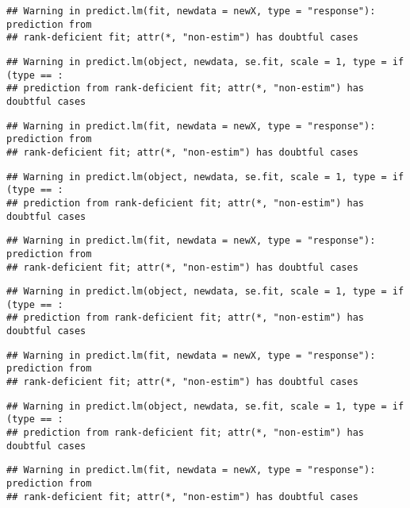 \documentclass[
]{article}
\begin{document}
\begin{verbatim}
## Warning in predict.lm(fit, newdata = newX, type = "response"): prediction from
## rank-deficient fit; attr(*, "non-estim") has doubtful cases
\end{verbatim}

\begin{verbatim}
## Warning in predict.lm(object, newdata, se.fit, scale = 1, type = if (type == :
## prediction from rank-deficient fit; attr(*, "non-estim") has doubtful cases
\end{verbatim}

\begin{verbatim}
## Warning in predict.lm(fit, newdata = newX, type = "response"): prediction from
## rank-deficient fit; attr(*, "non-estim") has doubtful cases
\end{verbatim}

\begin{verbatim}
## Warning in predict.lm(object, newdata, se.fit, scale = 1, type = if (type == :
## prediction from rank-deficient fit; attr(*, "non-estim") has doubtful cases
\end{verbatim}

\begin{verbatim}
## Warning in predict.lm(fit, newdata = newX, type = "response"): prediction from
## rank-deficient fit; attr(*, "non-estim") has doubtful cases
\end{verbatim}

\begin{verbatim}
## Warning in predict.lm(object, newdata, se.fit, scale = 1, type = if (type == :
## prediction from rank-deficient fit; attr(*, "non-estim") has doubtful cases
\end{verbatim}

\begin{verbatim}
## Warning in predict.lm(fit, newdata = newX, type = "response"): prediction from
## rank-deficient fit; attr(*, "non-estim") has doubtful cases
\end{verbatim}

\begin{verbatim}
## Warning in predict.lm(object, newdata, se.fit, scale = 1, type = if (type == :
## prediction from rank-deficient fit; attr(*, "non-estim") has doubtful cases
\end{verbatim}

\begin{verbatim}
## Warning in predict.lm(fit, newdata = newX, type = "response"): prediction from
## rank-deficient fit; attr(*, "non-estim") has doubtful cases
\end{verbatim}
\end{document}
